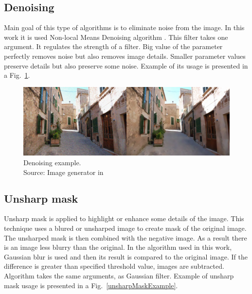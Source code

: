 \documentclass[a4paper,onecolumn,oneside,12pt]{memoir}
\begin{document}
\subsection{Denoising}

Main goal of this type of algorithms is to eliminate noise from the image. In this work it is used 
Non-local Means Denoising algorithm \cite{nonLocalMeansDenoising}. This filter takes one argument.
It regulates the strength of a filter. Big value of the parameter perfectly removes noise but also
removes image details. Smaller parameter values preserve details but also preserve some noise.
Example of its usage is presented in a Fig.~\ref{denoisingExample}.

\begin{figure}[ht]
\begin{center}
\includegraphics[scale=0.3]{images/denoisingExample.jpg}
\caption{Denoising example. \\
Source: Image generator in \cite{nonLocalMeansDenoising}}
\label{denoisingExample}
\end{center}
\end{figure}

\subsection{Unsharp mask}

Unsharp mask \cite{unsharpMaskWiki} is applied to highlight or enhance some details of the image.
This technique uses a blured or unsharped image to create mask of the
original image. The unsharped mask is then combined with the negative image. As a result there is an
image less blurry than the original. In the algorithm used in this work, Gaussian blur is used and
then its result is compared to the original image. If the difference is greater than specified
threshold value, images are subtracted. Algorithm takes the same arguments, as Gaussian filter.
Example of unsharp mask usage is presented in a Fig.~\ref{unsharpMaskExample}.
\end{document}
